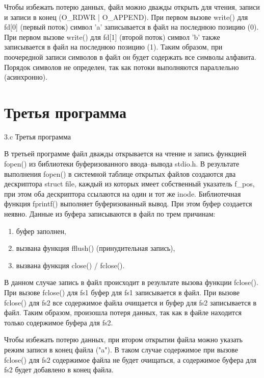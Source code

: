 Чтобы избежать потерю данных, файл можно дважды открыть для чтения, записи и записи в конец (O\_RDWR | O\_APPEND).
При первом вызове write() для fd[0] (первый поток) символ 'a' записывается в файл на последнюю позицию (0).
При первом вызове write() для fd[1] (второй поток) символ 'b' также записывается в файл на последнюю позицию (1).
Таким образом, при поочередной записи символов в файл он будет содержать все символы алфавита.
Порядок символов не определен, так как потоки выполняются параллельно (асинхронно).

\clearpage

\section{Третья программа}

{3.c} %
{Третья программа} %


В третьей программе файл дважды открывается на чтение и запись функцией fopen() из библиотеки буферизованного ввода--вывода stdio.h.
В результате выполнения fopen() в системной таблице открытых файлов создаются два дескриптора struct file, каждый из которых имеет собственный указатель f\_pos, при этом оба дескриптора ссылаются на один и тот же inode.
Библиотечная функция fprintf() выполняет буферизованный вывод.
При этом буфер создается неявно.
Данные из буфера записываются в файл по трем причинам:

\begin{enumerate}
	\item буфер заполнен,
	\item вызвана функция fflush() (принудительная запись),
	\item вызвана функция close() / fclose().
\end{enumerate}

В данном случае запись в файл происходит в результате вызова функции fclose().
При вызове fclose() для fs1 буфер для fs1 записывается в файл.
При вызове fclose() для fs2 все содержимое файла очищается и буфер для fs2 записывается в файл.
Таким образом, произошла потеря данных, так как в файле находится только содержимое буфера для fs2.

Чтобы избежать потерю данных, при втором открытии файла можно указать режим записи в конец файла ("a").
В таком случае содержимое при вызове fclose() для fs2 содержимое файла не будет очищаться, а содержимое буфера для fs2 будет добавлено в конец файла.

